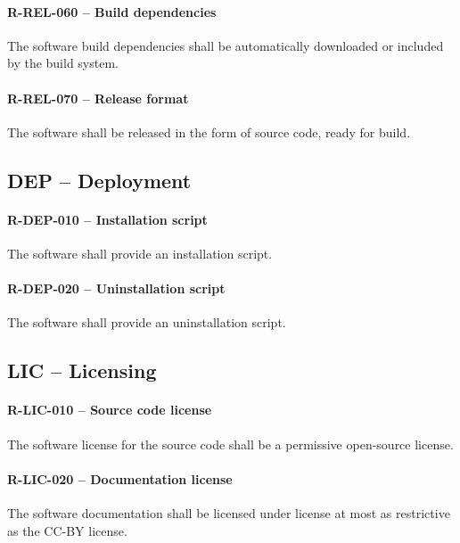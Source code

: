 \paragraph{R-REL-060 -- Build dependencies}
The software build dependencies shall be automatically downloaded or included by
the build system.

\paragraph{R-REL-070 -- Release format}
The software shall be released in the form of source code, ready for build.

\subsection{DEP -- Deployment}
\paragraph{R-DEP-010 -- Installation script}
The software shall provide an installation script.

\paragraph{R-DEP-020 -- Uninstallation script}
The software shall provide an uninstallation script.

\subsection{LIC -- Licensing}
\paragraph{R-LIC-010 -- Source code license}
The software license for the source code shall be a permissive open-source
license.

\paragraph{R-LIC-020 -- Documentation license}
The software documentation shall be licensed under license at most as
restrictive as the CC-BY license.
